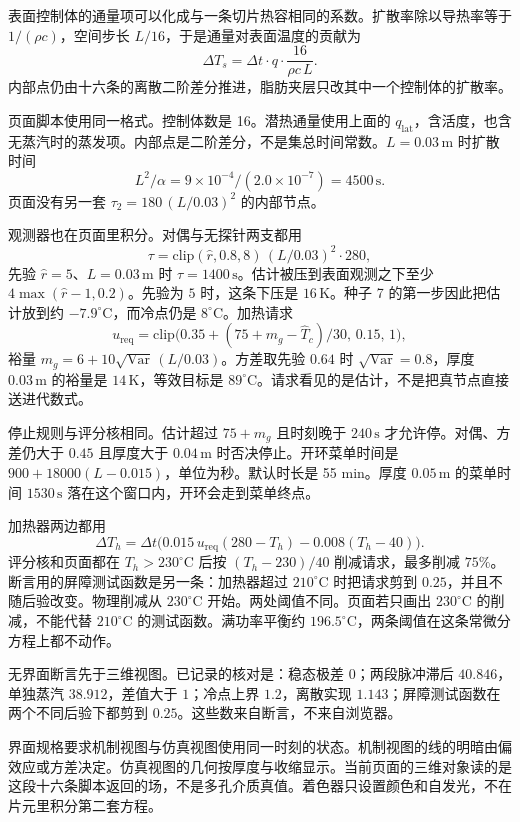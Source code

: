 表面控制体的通量项可以化成与一条切片热容相同的系数。扩散率除以导热率等于 $1/(\rho c)$，空间步长 $L/16$，于是通量对表面温度的贡献为
\[
\Delta T_s=\Delta t\cdot q\cdot\frac{16}{\rho c\, L}.
\]
内部点仍由十六条的离散二阶差分推进，脂肪夹层只改其中一个控制体的扩散率。

页面脚本使用同一格式。控制体数是 16。潜热通量使用上面的 $q_{\mathrm{lat}}$，含活度，也含无蒸汽时的蒸发项。内部点是二阶差分，不是集总时间常数。$L=0.03\,\mathrm{m}$ 时扩散时间
\[
L^2/\alpha=9\times 10^{-4}/(2.0\times 10^{-7})=4500\,\mathrm{s}.
\]
页面没有另一套 $\tau_2=180\,(L/0.03)^2$ 的内部节点。

观测器也在页面里积分。对偶与无探针两支都用
\[
\tau=\mathrm{clip}(\hat r,0.8,8)\,(L/0.03)^2\cdot 280,
\]
先验 $\hat r=5$、$L=0.03\,\mathrm{m}$ 时 $\tau=1400\,\mathrm{s}$。估计被压到表面观测之下至少 $4\max(\hat r-1,0.2)$。先验为 $5$ 时，这条下压是 $16\,\mathrm{K}$。种子 7 的第一步因此把估计放到约 $-7.9^\circ\mathrm{C}$，而冷点仍是 $8^\circ\mathrm{C}$。加热请求
\[
u_{\mathrm{req}}=\mathrm{clip}\big(0.35+(75+m_g-\widehat T_c)/30,\,0.15,\,1\big),
\]
裕量 $m_g=6+10\sqrt{\mathrm{Var}}\,(L/0.03)$。方差取先验 $0.64$ 时 $\sqrt{\mathrm{Var}}=0.8$，厚度 $0.03\,\mathrm{m}$ 的裕量是 $14\,\mathrm{K}$，等效目标是 $89^\circ\mathrm{C}$。请求看见的是估计，不是把真节点直接送进代数式。

停止规则与评分核相同。估计超过 $75+m_g$ 且时刻晚于 $240\,\mathrm{s}$ 才允许停。对偶、方差仍大于 $0.45$ 且厚度大于 $0.04\,\mathrm{m}$ 时否决停止。开环菜单时间是 $900+18000(L-0.015)$，单位为秒。默认时长是 55 min。厚度 $0.05\,\mathrm{m}$ 的菜单时间 $1530\,\mathrm{s}$ 落在这个窗口内，开环会走到菜单终点。

加热器两边都用
\[
\Delta T_h=\Delta t\big(0.015\,u_{\mathrm{req}}(280-T_h)-0.008(T_h-40)\big).
\]
评分核和页面都在 $T_h>230^\circ\mathrm{C}$ 后按 $(T_h-230)/40$ 削减请求，最多削减 $75\%$。断言用的屏障测试函数是另一条：加热器超过 $210^\circ\mathrm{C}$ 时把请求剪到 $0.25$，并且不随后验改变。物理削减从 $230^\circ\mathrm{C}$ 开始。两处阈值不同。页面若只画出 $230^\circ\mathrm{C}$ 的削减，不能代替 $210^\circ\mathrm{C}$ 的测试函数。满功率平衡约 $196.5^\circ\mathrm{C}$，两条阈值在这条常微分方程上都不动作。

无界面断言先于三维视图。已记录的核对是：稳态极差 $0$；两段脉冲滞后 $40.846$，单独蒸汽 $38.912$，差值大于 $1$；冷点上界 $1.2$，离散实现 $1.143$；屏障测试函数在两个不同后验下都剪到 $0.25$。这些数来自断言，不来自浏览器。

界面规格要求机制视图与仿真视图使用同一时刻的状态。机制视图的线的明暗由偏效应或方差决定。仿真视图的几何按厚度与收缩显示。当前页面的三维对象读的是这段十六条脚本返回的场，不是多孔介质真值。着色器只设置颜色和自发光，不在片元里积分第二套方程。

